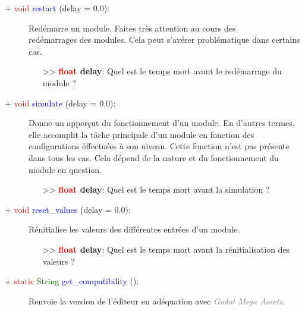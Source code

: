 \documentclass[a4paper, 11pt]{article}
\begin{document}
	\newpage \begin{description}
		\item [+ \textcolor{red}{void} \textcolor{blue}{restart} (delay = 0.0):] Redémarre un module. Faites 
		très attention au cours des \\redémarrages des modules. Cela peut s'avérer problématique dans 
		certains cas.
		\begin{itemize}
			\item [>> \textbf{\textcolor{red}{float} delay}:] Quel est le temps mort avant le redémarrage du 
			module ?\\
		\end{itemize}
	\end{description}
	\begin{description}
		\item [+ \textcolor{red}{void} \textcolor{blue}{simulate} (delay = 0.0):] Donne un apperçut du 
		fonctionnement d'un module. En d'autres termes, elle accomplit la tâche principale d'un module en 
		fonction des configurations éffectuées à son niveau. Cette fonction n'est pas présente dans tous les 
		cas. Cela dépend de la nature et du fonctionnement du module en question.
		\begin{itemize}
			\item [>> \textbf{\textcolor{red}{float} delay}:] Quel est le temps mort avant la simulation ?\\
		\end{itemize}
	\end{description}
	\begin{description}
		\item [+ \textcolor{red}{void} \textcolor{blue}{reset\_values} (delay = 0.0):] Rénitialise les 
		valeurs des différentes entrées d'un module.
		\begin{itemize}
			\item [>> \textbf{\textcolor{red}{float} delay}:] Quel est le temps mort avant la 
			rénitialisation des valeurs ?\\
		\end{itemize}
	\end{description}
	\begin{description}
		\item [+ \textcolor{red}{static} \textcolor{darkgreen}{String} \textcolor{blue}{get\_compatibility} 
		():] Renvoie la version de l'éditeur en adéquation avec \textcolor{gray}{\textit{Godot Mega 
		Assets}}.\\
	\end{description}
\end{document}
